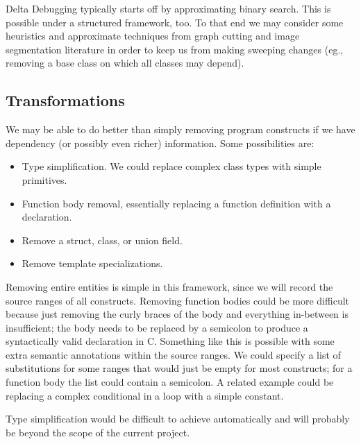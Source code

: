 \documentclass[11pt]{article}
\begin{document}
\begin{itemize}
Delta Debugging typically starts off by approximating binary search. This is
possible under a structured framework, too. To that end we may consider some
heuristics and approximate techniques from graph cutting and image segmentation
literature \cite{nc} in order to keep us from making sweeping changes (eg.,
removing a base class on which all classes may depend).

\subsection{Transformations}
We may be able to do better than simply removing program constructs
if we have dependency (or possibly even richer) information.  Some possibilities are:
\begin{itemize}
\item Type simplification.  We could replace complex class types with simple primitives.
\item Function body removal, essentially replacing a function definition with a declaration.
\item Remove a struct, class, or union field.
\item Remove template specializations.
\end{itemize}

Removing entire entities is simple in this framework, since we will record
the source ranges of all constructs.
Removing function bodies could be more difficult because just removing
the curly braces of the body and everything in-between is
insufficient; the body needs to be replaced by a semicolon to produce
a syntactically valid declaration in C.  Something like this is
possible with some extra semantic annotations within the
source ranges. We could specify a list of substitutions for some
ranges that would just be empty for most constructs; for a function
body the list could contain a semicolon.  A related example could be
replacing a complex conditional in a loop with a simple constant.

Type simplification would be difficult to achieve automatically and
will probably be beyond the scope of the current project.

\end{itemize}
\end{document}

